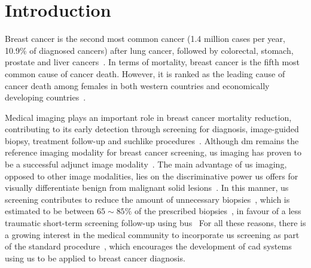 \graphicspath{ {./content/intro/figures/} }

\section{Introduction}
\label{sec:intro}  %


Breast cancer is the second most common cancer (1.4 million cases per year, 10.9\% of  diagnosed cancers) after lung cancer, followed by colorectal, stomach, prostate and liver cancers~\cite{Ferlay2010}.
In terms of mortality, breast cancer is the fifth most common cause of cancer death.
However, it is ranked as the leading cause of cancer death among females in both western countries and economically developing countries~\cite{cancerStatistics2011}.

Medical imaging plays an important role in breast cancer mortality reduction, contributing to its early detection through screening for diagnosis, image-guided biopsy, treatment follow-up and suchlike procedures~\cite{smith2003american}.
Although \ac{dm} remains the reference imaging modality for breast cancer screening, \ac{us} imaging has proven to be a successful adjunct image modality~\cite{smith2003american,berg2004diagnostic}.
The main advantage of \ac{us} imaging, opposed to other image modalities, lies on the discriminative power \ac{us} offers for visually differentiate benign from malignant solid lesions~\cite{Stavros:1995p12392}.
In this manner, \ac{us} screening contributes to reduce the amount of unnecessary biopsies~\cite{ciatto1994contribution}, which is estimated to be between $65\sim85\%$ of the prescribed biopsies~\cite{yuan2010multimodality}, in favour of a less traumatic short-term screening follow-up using \ac{bus}~\cite{gordon1995malignant}
For all these reasons, there is a growing interest in the medical community to incorporate \ac{us} screening as part of the standard procedure~\cite{biradsus}, which encourages the development of \ac{cad} systems using \ac{us} to be applied to breast cancer diagnosis.

